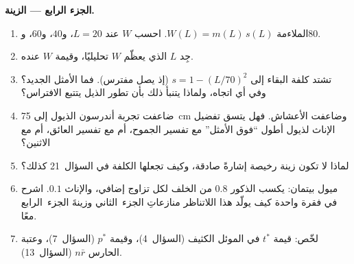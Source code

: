 \begin{problem}
\medskip
\noindent\textbf{الجزء الرابع --- الزينة.}
\begin{enumerate}[resume]
  \item الملاءمة $W(L) = m(L)\,s(L)$. احسب $W$ عند $L = 20$، و$40$، و$60$،
        و$80$.
  \item جِد $L$ الذي يعظّم $W$ تحليليًا، وقيمة $W$ عنده.
  \item تشتد كلفة البقاء إلى $s = 1 - (L/70)^{2}$ (إذ يصل
        مفترس). فما الأمثل الجديد؟ وفي أي اتجاه، ولماذا يتنبأ
        ذلك بأن تطور الذيل يتتبع الافتراس؟
  \item ضاعفت تجربة أندرسون الذيول إلى \qty{75}{cm} وضاعفت
        الأعشاش. فهل يتسق تفضيل الإناث لذيول أطول ``فوق
        الأمثل'' مع تفسير الجموح، أم مع تفسير العائق، أم مع
        الاثنين؟
  \item لماذا لا تكون زينة رخيصة إشارةً صادقة، وكيف تجعلها
        الكلفة في السؤال~21 كذلك؟
  \item ميول بيتمان: يكسب الذكور $0.8$ من الخلف لكل تزاوج
        إضافي، والإناث $0.1$. اشرح في فقرة واحدة كيف يولّد هذا
        اللاتناظر منازعاتِ الجزء~الثاني وزينةَ الجزء~الرابع
        معًا.
  \item لخّص: قيمة $t^{*}$ في الموئل الكثيف (السؤال~4)،
        وقيمة $p^{*}$ (السؤال~7)، وعتبة الحارس $n\bar r$
        (السؤال~13).
\end{enumerate}
\end{problem}
